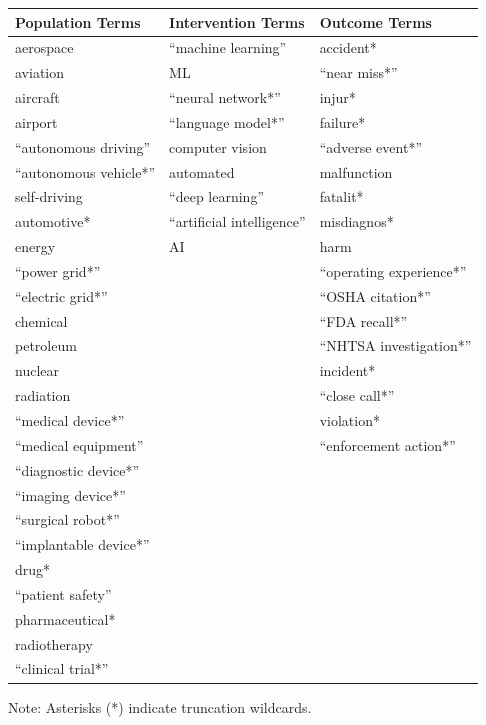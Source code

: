\begin{tabular}{p{} p{} p{}}
\hline
\textbf{Population Terms} & \textbf{Intervention Terms} & \textbf{Outcome Terms} \\
\hline
aerospace & ``machine learning'' & accident* \\
aviation & ML & ``near miss*'' \\
aircraft & ``neural network*'' & injur* \\
airport & ``language model*'' & failure* \\
``autonomous driving'' & computer vision & ``adverse event*'' \\
``autonomous vehicle*'' & automated & malfunction \\
self-driving & ``deep learning'' & fatalit* \\
automotive* & ``artificial intelligence'' & misdiagnos* \\
energy & AI & harm \\
``power grid*'' & & ``operating experience*'' \\
``electric grid*'' & & ``OSHA citation*'' \\
chemical & & ``FDA recall*'' \\
petroleum & & ``NHTSA investigation*'' \\
nuclear &  & incident* \\
radiation &  & ``close call*'' \\
``medical device*'' & & violation* \\
``medical equipment'' & & ``enforcement action*'' \\
``diagnostic device*'' & & \\
``imaging device*'' & & \\
``surgical robot*'' & & \\
``implantable device*'' & & \\
drug* & & \\
``patient safety'' & & \\
pharmaceutical* & & \\
radiotherapy & & \\
``clinical trial*'' & & \\
\hline
\end{tabular}
\begin{tablenotes}
\small
\item Note: Asterisks (*) indicate truncation wildcards.
\end{tablenotes}